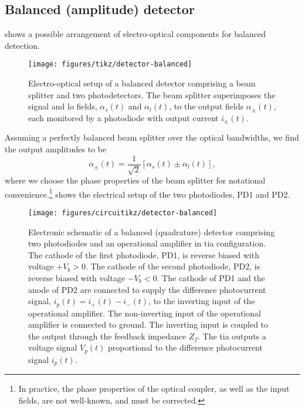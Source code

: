 \FloatBarrier
\subsection{Balanced (amplitude) detector}


 shows a possible arrangement of electro-optical components for balanced detection.
\begin{figure}[htb]
    \centering
    \texttt{[image: figures/tikz/detector-balanced]}
    \caption{Electro-optical setup of a balanced detector comprising a beam splitter and two photodetectors. The beam splitter superimposes the signal and \gls{lo} fields, $\alpha_s(t)$ and $\alpha_l(t)$, to the output fields $\alpha_\pm(t)$, each monitored by a photodiode with output current $i_\pm(t)$.}\label{fig:detector_balanced_optics}
\end{figure}
Assuming a perfectly balanced beam splitter over the optical bandwidths, we find the output amplitudes to be
\begin{equation}
	\alpha_\pm(t)
	=
	\frac{1}{\sqrt{2}}
	\left[
		\alpha_s(t)
		\pm
		\alpha_l(t)
	\right]
	\label{eq:detector_balanced_amplitudes}
	,
\end{equation}
where we choose the phase properties of the beam splitter for notational convenience.\footnote{In practice, the phase properties of the optical coupler, as well as the input fields, are not well-known, and must be corrected.}
 shows the electrical setup of the two photodiodes, PD1 and PD2.
\begin{figure}[htb]
    \centering
    \texttt{[image: figures/circuitikz/detector-balanced]}
    \caption{Electronic schematic of a balanced (quadrature) detector comprising two photodiodes and an operational amplifier in \gls{tia} configuration. The cathode of the first photodiode, PD1, is reverse biased with voltage $+V_b>0$. The cathode of the second photodiode, PD2, is reverse biased with voltage $-V_b<0$. The cathode of PD1 and the anode of PD2 are connected to supply the difference photocurrent signal, $i_p(t)=i_+(t)-i_-(t)$, to the inverting input of the operational amplifier. The non-inverting input of the operational amplifier is connected to ground. The inverting input is coupled to the output through the feedback impedance $Z_f$. The \gls{tia} outputs a voltage signal $V_p(t)$ proportional to the difference photocurrent signal $i_p(t)$.}\label{fig:detector_balanced_electronics}
\end{figure}
